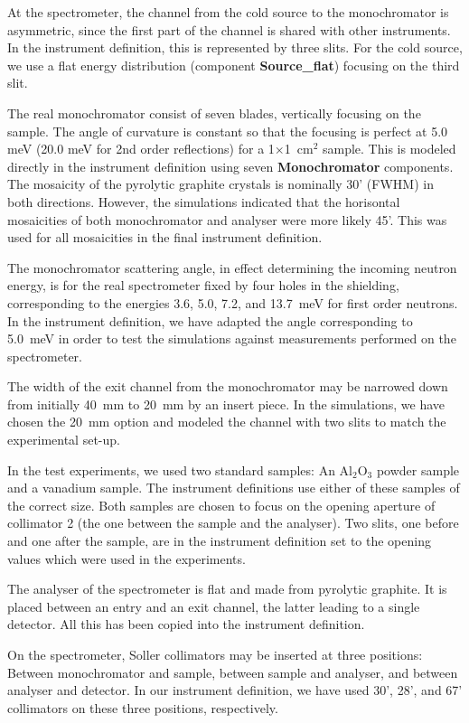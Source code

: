 At the spectrometer, the channel from the cold source 
to the monochromator is asymmetric, since the first
part of the channel is shared with other instruments.
In the instrument definition, this is represented by
three slits.
For the cold source, we use a flat energy
distribution (component {\bf Source\_flat}) 
focusing on the third slit.

The real monochromator consist of seven blades, vertically focusing on
the sample. The angle of curvature is constant so that the focusing is
perfect at 5.0 meV (20.0 meV for 2nd order reflections) for a 1$\times$1~cm$^2$
sample. This is modeled directly in the instrument definition using
seven {\bf Monochromator} components. The mosaicity of the pyrolytic
graphite crystals is nominally 30' (FWHM) in both directions.  However, the
simulations indicated that the horisontal mosaicities of both
monochromator and analyser were more likely 45'. This was used for all
mosaicities in the final instrument definition.

The monochromator scattering angle, in effect determining the incoming
neutron energy, is for the real spectrometer fixed by four holes in the
shielding, corresponding to the energies 3.6, 5.0, 7.2, and 13.7~meV for
first order neutrons.  In the instrument definition, we have adapted the
angle corresponding to 5.0~meV in order to test the simulations against
measurements performed on the spectrometer.

The width of the exit channel from the monochromator may 
be narrowed down from initially 40~mm
to 20~mm by an insert piece. In the simulations, we have chosen
the 20~mm option and modeled the channel with two slits to match
the experimental set-up.

In the test experiments, we used two standard samples:
An Al$_2$O$_3$ powder sample and a vanadium sample. The instrument
definitions use either of these samples of the correct
size. Both samples are chosen to focus on the opening aperture of
collimator 2 (the one between the sample and the analyser).
Two slits, one before and one after the sample,
are in the instrument definition set to the opening values which
were used in the experiments.

The analyser of the spectrometer is flat and made from 
pyrolytic graphite. It is placed between an entry and 
an exit channel, the latter leading to a single detector.
All this has been copied into the instrument definition.

On the spectrometer, Soller collimators may be inserted
at three positions: Between monochromator and sample,
between sample and analyser, and between analyser and detector.
In our instrument definition, we have used 30', 28', and 67' collimators
on these three positions, respectively.

